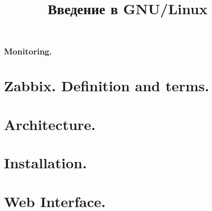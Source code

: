 

\title{Введение в GNU/Linux}




\begin{frame}
	\frametitle{Monitoring.}
	\titlepage
	\vspace{-0.5cm}
	\begin{center}
	\end{center}
\end{frame}


\begin{frame}
	\tableofcontents
	[hideallsubsections]
\end{frame}


\section{Zabbix. Definition and terms.}
\section{Architecture.}
\section{Installation.}
\section{Web Interface.}


